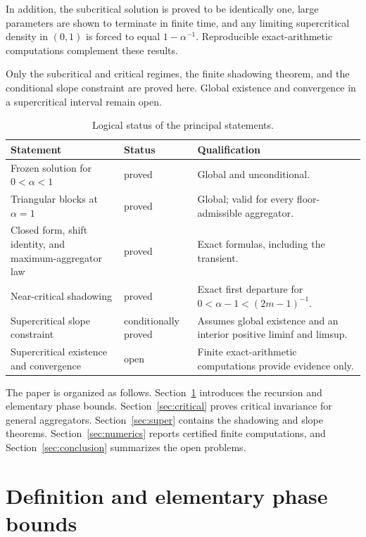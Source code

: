 \documentclass[11pt]{article}
\theoremstyle{definition}
\theoremstyle{remark}
\begin{document}
In addition, the subcritical solution is proved to be identically one,
large parameters are shown to terminate in finite time, and any limiting
supercritical density in $(0,1)$ is forced to equal $1-\alpha^{-1}$.
Reproducible exact-arithmetic computations complement these results.

Only the subcritical and critical regimes, the finite shadowing theorem, and
the conditional slope constraint are proved here.  Global existence and
convergence in a supercritical interval remain open.

\begin{table}[htbp]
\centering
\small
\caption{Logical status of the principal statements.}
\label{tab:status}
\begin{tabularx}{\textwidth}{@{}
>{\raggedright\arraybackslash}p{}
>{\raggedright\arraybackslash}p{}
>{\raggedright\arraybackslash}X@{}}
\toprule
Statement & Status & Qualification \\
\midrule
Frozen solution for $0<\alpha<1$ & proved & Global and unconditional. \\
Triangular blocks at $\alpha=1$ & proved & Global; valid for every
floor-admissible aggregator. \\
Closed form, shift identity, and maximum-aggregator law & proved & Exact
formulas, including the transient. \\
Near-critical shadowing & proved & Exact first departure for
$0<\alpha-1<(2m-1)^{-1}$. \\
Supercritical slope constraint & conditionally proved & Assumes global
existence and an interior positive liminf and limsup. \\
Supercritical existence and convergence & open & Finite exact-arithmetic
computations provide evidence only. \\
\bottomrule
\end{tabularx}
\end{table}

The paper is organized as follows.  Section~\ref{sec:definition} introduces
the recursion and elementary phase bounds.  Section~\ref{sec:critical}
proves critical invariance for general aggregators.  Section~\ref{sec:super}
contains the shadowing and slope theorems.  Section~\ref{sec:numerics}
reports certified finite computations, and Section~\ref{sec:conclusion}
summarizes the open problems.

\section{Definition and elementary phase bounds}\label{sec:definition}
\end{document}
